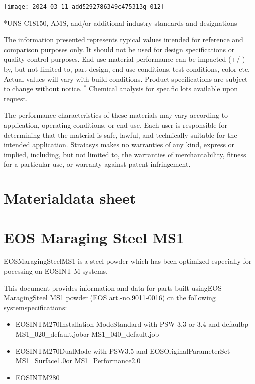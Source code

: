 \documentclass[10pt]{article}
\begin{document}
\begin{center}
\texttt{[image: 2024\_03\_11\_add5292786349c475313g-012]}
\end{center}

*UNS C18150, AMS, and/or additional industry standards and designations

The information presented represents typical values intended for reference and comparison purposes only. It should not be used for design specifications or quality control purposes. End-use material performance can be impacted (+/-) by, but not limited to, part design, end-use conditions, test conditions, color etc. Actual values will vary with build conditions. Product specifications are subject to change without notice. ${ }^{*}$ Chemical analysis for specific lots available upon request.

The performance characteristics of these materials may vary according to application, operating conditions, or end use. Each user is responsible for determining that the material is safe, lawful, and technically suitable for the intended application. Stratasys makes no warranties of any kind, express or implied, including, but not limited to, the warranties of merchantability, fitness for a particular use, or warranty against patent infringement.

\section*{Materialdata sheet}
\section*{EOS Maraging Steel MS1}
EOSMaragingSteelMS1 is a steel powder which has been optimized especially for pocessing on EOSINT M systems.

This document provides information and data for parts built usingEOS MaragingSteel MS1 powder (EOS art.-no.9011-0016) on the following systemspecifications:

\begin{itemize}
  \item EOSINTM270Installation ModeStandard with PSW 3.3 or 3.4 and defaulbp MS1\_020\_default.jobor MS1\_040\_default.job
  \item EOSINTM270DualMode with PSW3.5 and EOSOriginalParameterSet MS1\_Surface1.0or MS1\_Performance2.0
  \item EOSINTM280
\end{itemize}
\end{document}
